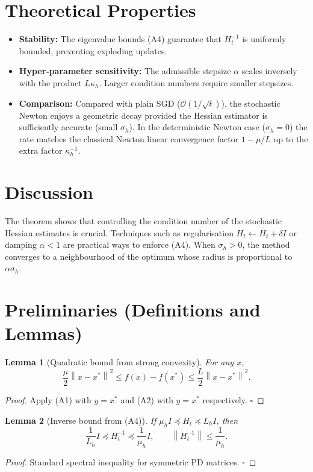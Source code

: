 \documentclass{article}
\newtheorem{lemma}{Lemma}
\newcommand{\norm}[1]{\left\|#1\right\|}
\begin{document}
\section*{Theoretical Properties}
\begin{itemize}
\item \textbf{Stability:} The eigenvalue bounds (A4) guarantee that $H_{t}^{-1}$ is uniformly bounded, preventing exploding updates.
\item \textbf{Hyper‑parameter sensitivity:} The admissible stepsize $\alpha$ scales inversely with the product $L\kappa_{h}$. Larger condition numbers require smaller stepsizes.
\item \textbf{Comparison:} Compared with plain SGD ($\mathcal{O}(1/\sqrt{t})$), the stochastic Newton enjoys a geometric decay provided the Hessian estimator is sufficiently accurate (small $\sigma_{h}$). In the deterministic Newton case ($\sigma_{h}=0$) the rate matches the classical Newton linear convergence factor $1-\mu/L$ up to the extra factor $\kappa_{h}^{-1}$.
\end{itemize}

\section*{Discussion}
The theorem shows that controlling the condition number of the stochastic Hessian estimates is crucial. Techniques such as regularisation $H_{t}\leftarrow H_{t}+ \delta I$ or damping $\alpha<1$ are practical ways to enforce (A4). When $\sigma_{h}>0$, the method converges to a neighbourhood of the optimum whose radius is proportional to $\alpha\sigma_{h}$.

\section*{Preliminaries (Definitions and Lemmas)}
\begin{lemma}[Quadratic bound from strong convexity]
For any $x$,
\[
\frac{\mu}{2}\norm{x-x^{*}}^{2}\le f(x)-f(x^{*})\le\frac{L}{2}\norm{x-x^{*}}^{2}.
\tag{L1}
\]
\end{lemma}
\begin{proof}
Apply (A1) with $y=x^{*}$ and (A2) with $y=x^{*}$ respectively. \hfill $\square$
\end{proof}

\begin{lemma}[Inverse bound from (A4)]
If $\mu_{h}I\preceq H_{t}\preceq L_{h}I$, then
\[
\frac{1}{L_{h}}I\preceq H_{t}^{-1}\preceq\frac{1}{\mu_{h}}I,
\qquad
\norm{H_{t}^{-1}}\le\frac{1}{\mu_{h}}.
\tag{L2}
\]
\end{lemma}
\begin{proof}
Standard spectral inequality for symmetric PD matrices. \hfill $\square$
\end{proof}
\end{document}
